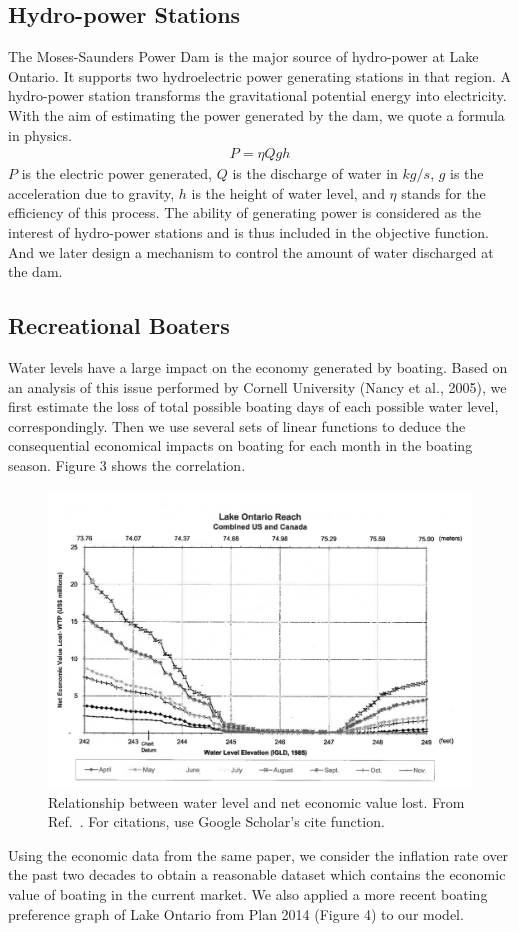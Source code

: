 \documentclass[pre,12pt]{revtex4-1}
\begin{document}
\subsection{Hydro-power Stations}
The Moses-Saunders Power Dam is the major source of hydro-power at Lake Ontario. It supports two hydroelectric power generating stations in that region. A hydro-power station transforms the gravitational potential energy into electricity. With the aim of estimating the power generated by the dam, we quote a formula in physics. 
\begin{align}
    P = \eta Qgh
\end{align}
$P$ is the electric power generated, $Q$ is the discharge of water in $kg/s$, $g$ is the acceleration due to gravity, $h$ is the height of water level, and $\eta$ stands for the efficiency of this process. The ability of generating power is considered as the interest of hydro-power stations and is thus included in the objective function. And we later design a mechanism to control the amount of water discharged at the dam.

\subsection{Recreational Boaters}
Water levels have a large impact on the economy generated by boating. Based on an analysis of this issue performed by Cornell University (Nancy et al., 2005), we first estimate the loss of total possible boating days of each possible water level, correspondingly. Then we use several sets of linear functions to deduce the consequential economical impacts on boating for each month in the boating season. Figure 3 shows the correlation. \par
\begin{figure}[htbp]
\begin{center}
\includegraphics[width=4.5in]{boating.png}
\caption{Relationship between water level and net economic value lost.  From Ref.~\cite{nd97}. For citations, use Google Scholar's cite function.}
\label{leaf}
\end{center}
\end{figure}
Using the economic data from the same paper, we consider the inflation rate over the past two decades to obtain a reasonable dataset which contains the economic value of boating in the current market. We also applied a more recent boating preference graph of Lake Ontario from Plan 2014 (Figure 4) to our model. 
\end{document}

